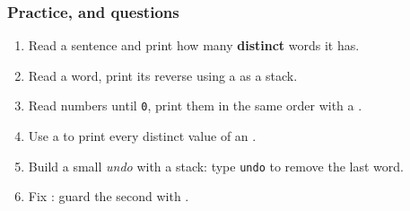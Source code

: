 \documentclass[aspectratio=169,10pt,compress]{beamer}
\begin{document}
\begin{frame}[t,fragile] \frametitle{Practice, and questions}
  \begin{enumerate}\small
    \item Read a sentence and print how many \textbf{distinct} words it has.
    \item Read a word, print its reverse using a  as a stack.
    \item Read numbers until \texttt{0}, print them in the same order with a .
    \item Use a  to print every distinct value of an .
    \item Build a small \emph{undo} with a stack: type \texttt{undo} to remove the last word.
    \item Fix : guard the second  with .
  \end{enumerate}
  \vspace{0.5em}
  \begin{center}
  \end{center}
  \vspace{0.6em}
  \begin{center}
  \end{center}
\end{frame}
\end{document}
